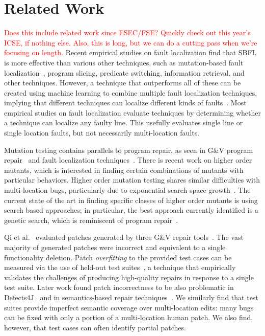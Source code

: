 \documentclass[10pt, conference]{IEEEtran}
\newcommand\todo[1]{\textcolor{red}{#1}}
\begin{document}
\section{Related Work}
\label{sec:related}

\todo{Does this include related work since ESEC/FSE?  Quickly check out this
  year's ICSE, if nothing else.}
\todo{Also, this is long, but we can do a cutting pass when we're focusing on length.}
Recent empirical studies on fault localization find that 
SBFL is more effective than various other techniques, such as 
mutation-based fault localization~\cite{pearson2017evaluating, mut-analysis}, program 
slicing, predicate switching,  information retrieval, and other techniques. 
However, a 
technique that outperforms all of these can be created using machine learning to combine 
multiple fault localization techniques, implying that different techniques can 
localize different kinds of faults~\cite{zou2019empirical}. Most empirical 
studies on fault localization evaluate techniques by determining whether a 
technique can localize any faulty line. This usefully evaluates single line or single 
location faults, but not necessarily multi-location faults.

Mutation testing contains parallels to program repair, as seen in G\&V
program repair~\cite{weimer2013leveraging} and fault 
localization techniques~\cite{metallaxis,muse,mbfl-survey}. 
There is recent work on higher order mutants, which is interested in finding 
certain combinations of mutants with particular behaviors. Higher order mutation testing 
shares similar difficulties with multi-location bugs, particularly due to 
exponential search space growth~\cite{long-search-spaces}. 
The current state of the art in finding specific classes of 
higher order mutants is using search based approaches; in particular, the best approach 
currently identified is a genetic search, which is reminiscent of program repair~\cite{homs, 
genprog}.

Qi et al.~\cite{patch-correctness} evaluated patches generated 
by three G\&V repair tools~\cite{genprog, ae, rsrepair}. 
The vast majority of generated patches were incorrect and equivalent to 
a single functionality deletion.  Patch \emph{overfitting} to the provided test
cases can be measured via the use of held-out test
suites~\cite{Smith15fse}, a technique that empirically validates the challenges of producing
high-quality repairs in response to a single test suite.   Later work found patch incorrectness to be 
also problematic in Defects4J~\cite{d4j-eval} and in semantics-based 
repair techniques~\cite{Le2018}.  We similarly find that test suites provide
imperfect semantic coverage over multi-location edits: many bugs can be fixed
with only a portion of a multi-location human patch.  We 
also find, however, that test cases can often identify partial patches. 
\end{document}
